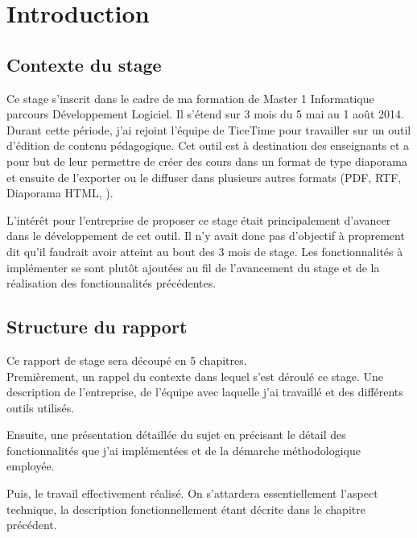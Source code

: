 \chapter*{Introduction}

\section*{Contexte du stage}
Ce stage s'inscrit dans le cadre de ma formation de Master 1 Informatique parcours
Développement Logiciel. Il s'étend sur 3 mois du 5 mai au 1\ier{} août 2014.\\

Durant cette période, j'ai rejoint l'équipe de TiceTime pour travailler sur un
outil d'édition de contenu pédagogique. Cet outil est à destination des
enseignants et a pour but de leur permettre de créer des cours dans un format de
type diaporama et ensuite de l'exporter ou le diffuser dans plusieurs autres formats
(PDF, RTF, Diaporama HTML, ).

L'intérêt pour l'entreprise de proposer ce stage était principalement d'avancer
dans le développement de cet outil. Il n'y avait donc pas d'objectif à
proprement dit qu'il faudrait avoir atteint au bout des 3 mois de stage. Les
fonctionnalités à implémenter se sont plutôt ajoutées au fil de l'avancement du
stage et de la réalisation des fonctionnalités précédentes.

\section*{Structure du rapport}

Ce rapport de stage sera découpé en 5 chapitres.\\

Premièrement, un rappel du contexte dans lequel s'est déroulé ce stage. Une
description de l'entreprise, de l'équipe avec laquelle j'ai travaillé et des
différents outils utilisés.

Ensuite, une présentation détaillée du sujet en précisant le détail des
fonctionnalités que j'ai implémentées et de la démarche méthodologique
employée.

Puis, le travail effectivement réalisé. On s'attardera essentiellement l'aspect
technique, la description fonctionnellement étant décrite dans le chapitre
précédent.

